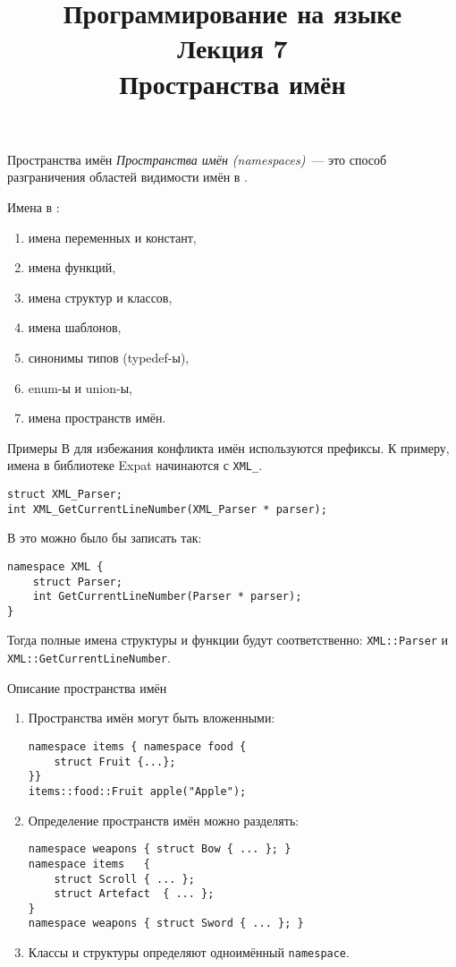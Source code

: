 \documentclass[aspectration=1610,t]{beamer}
\title{{\bf Программирование на языке \langcpp\protect\\Лекция
7\protect\vspace{1em}\\}Пространства имён}
\begin{document}
\begin{frame} 
  \titlepage
\end{frame}

\begin{frame}[fragile]{Пространства имён}
    \emph{Пространства имён (namespaces)}~--- это способ разграничения областей видимости
    имён в \langcpp.
\medskip

    \pause Имена в \langcpp:
    \begin{enumerate}
        \item имена переменных и констант,
        \item имена функций,
        \item имена структур и классов,
        \item имена шаблонов,
        \item синонимы типов (typedef-ы),
        \item enum-ы и union-ы,
        \item имена пространств имён.
    \end{enumerate}           
\end{frame}

\begin{frame}[fragile]{Примеры}
    В \langc для избежания конфликта имён используются префиксы.\newline
    К примеру,  имена в библиотеке Expat начинаются с
    \texttt{XML\_}.
    \begin{lstlisting}
struct XML_Parser;
int XML_GetCurrentLineNumber(XML_Parser * parser);
    \end{lstlisting}
\medskip

\pause В \langcpp это можно было бы записать так:
    \begin{lstlisting}
namespace XML {
    struct Parser;
    int GetCurrentLineNumber(Parser * parser);
}    \end{lstlisting}

Тогда полные имена структуры и функции будут соответственно:  \texttt{XML::Parser} и \texttt{XML::GetCurrentLineNumber}.
\end{frame}


\begin{frame}[fragile]{Описание пространства имён}
\small
    \begin{enumerate}
        \item Пространства имён могут быть вложенными:
    \begin{lstlisting}
namespace items { namespace food { 
    struct Fruit {...};
}}
items::food::Fruit apple("Apple");
    \end{lstlisting}
         \pause\item Определение пространств имён можно разделять:
    \begin{lstlisting}
namespace weapons { struct Bow { ... }; }
namespace items   { 
    struct Scroll { ... };
    struct Artefact  { ... };  
}
namespace weapons { struct Sword { ... }; }
    \end{lstlisting}
\pause\item Классы и структуры определяют одноимённый \texttt{namespace}.
    \end{enumerate}
\end{frame}
\end{document}

